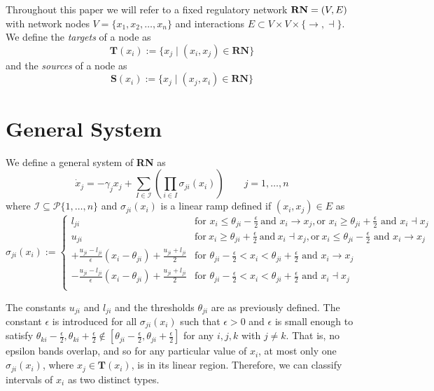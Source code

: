 \documentclass[12pt]{article}
\theoremstyle{definition}
\theoremstyle{remark}
\begin{document}
Throughout this paper we will refer to a fixed regulatory network $\textnormal{\textbf{RN}} = (V,E)$ with network nodes $V = \{x_1,x_2,\dots,x_n\}$ and interactions $E \subset V \times V \times \{\rightarrow,\dashv\}$. We define the \textit{targets} of a node as
\begin{equation*}
\mathbf{T}(x_i):=\{x_j \mid (x_i,x_j) \in \mathbf{RN} \}
\end{equation*}
and the \textit{sources} of a node as 
\begin{equation*}
\mathbf{S}(x_i):=\{x_j \mid (x_j,x_i) \in \mathbf{RN} \}
\end{equation*}

\section{General System}
We define a general system of \textbf{RN} as 
\begin{equation}	\label{generalsystem}
\dot{x}_j=-\gamma_j x_j + \sum_{I\in \mathcal{I}}\left(\prod_{i\in I}\sigma_{ji}(x_i)\right)	\qquad	j=1,\dots,n
\end{equation}
where $\mathcal{I}\subseteq \mathscr{P} \{1,\dots,n\}$ and $\sigma_{ji}(x_i)$  is a linear ramp defined if $(x_i,x_j) \in E$ as
\begin{equation}	\label{sigma}
\sigma_{ji}(x_i):=
\begin{cases}
l_{ji}	&	\text{for } x_i \le \theta_{ji}-\frac{\epsilon}{2}\ \text{and } x_i\to x_j, \text{or } x_i\geq\theta_{ji}+\frac{\epsilon}{2} \text{ and } x_i\dashv x_j\\
u_{ji}	&	\text{for}\ x_i \geq\theta_{ji}+\frac{\epsilon}{2}\ \text{and}\ x_i\dashv x_j, \text{or}\ x_i\le\theta_{ji}-\frac{\epsilon}{2} \text{ and } x_i\to x_j\\
+\frac{u_{ji}-l_{ji}}{\epsilon}(x_i-\theta_{ji}) + \frac{u_{ji}+l_{ji}}{2} &  \text{for } \theta_{ji}-\frac{\epsilon}{2}<x_i<\theta_{ji}+\frac{\epsilon}{2} \text{ and } x_i\to x_j\\
-\frac{u_{ji}-l_{ji}}{\epsilon}(x_i-\theta_{ji}) + \frac{u_{ji}+l_{ji}}{2} & \text{for } \theta_{ji}-\frac{\epsilon}{2}<x_i<\theta_{ji}+\frac{\epsilon}{2} \text{ and } x_i\dashv x_j\\
\end{cases}
\end{equation}	

The constants $u_{ji}$ and $l_{ji}$  and the thresholds $\theta_{ji}$ are as previously defined. The constant $\epsilon$ is introduced for all $\sigma_{ji}(x_i)$ such that $\epsilon>0$ and $\epsilon$ is small enough to satisfy $\theta_{ki}-\frac{\epsilon}{2},\theta_{ki}+\frac{\epsilon}{2}\notin [\theta_{ji}-\frac{\epsilon}{2},\theta_{ji}+\frac{\epsilon}{2}]$ for any $i,j,k$ with $j \neq k$. That is, no epsilon bands overlap, and so for any particular value of $x_i$, at most only one $\sigma_{ji}(x_i)$, where $x_j\in\mathbf{T}(x_i)$, is in its linear region. Therefore, we can classify intervals of $x_i$ as two distinct types.
\end{document}
